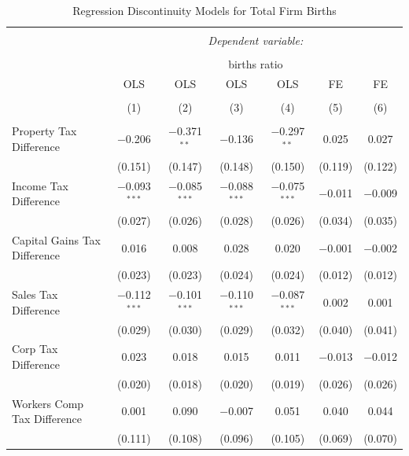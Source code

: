 \documentclass[12pt,a4paper]{article}
\begin{document}
\begin{landscape}

\begin{table}[!htbp] \centering 
  \caption{Regression Discontinuity Models for  Total Firm Births} 
  \label{--rd} 
\begin{tabular}{@{\extracolsep{5pt}}lcccccc} 
\\[-1.8ex]\hline 
\hline \\[-1.8ex] 
 & \multicolumn{6}{c}{\textit{Dependent variable:}} \\ 
\cline{2-7} 
\\[-1.8ex] & \multicolumn{6}{c}{births ratio} \\ 
 & OLS & OLS & OLS & OLS & FE & FE \\ 
\\[-1.8ex] & (1) & (2) & (3) & (4) & (5) & (6)\\ 
\hline \\[-1.8ex] 
 Property Tax Difference & $-$0.206 & $-$0.371$^{**}$ & $-$0.136 & $-$0.297$^{**}$ & 0.025 & 0.027 \\ 
  & (0.151) & (0.147) & (0.148) & (0.150) & (0.119) & (0.122) \\ 
  Income Tax Difference & $-$0.093$^{***}$ & $-$0.085$^{***}$ & $-$0.088$^{***}$ & $-$0.075$^{***}$ & $-$0.011 & $-$0.009 \\ 
  & (0.027) & (0.026) & (0.028) & (0.026) & (0.034) & (0.035) \\ 
  Capital Gains Tax Difference & 0.016 & 0.008 & 0.028 & 0.020 & $-$0.001 & $-$0.002 \\ 
  & (0.023) & (0.023) & (0.024) & (0.024) & (0.012) & (0.012) \\ 
  Sales Tax Difference & $-$0.112$^{***}$ & $-$0.101$^{***}$ & $-$0.110$^{***}$ & $-$0.087$^{***}$ & 0.002 & 0.001 \\ 
  & (0.029) & (0.030) & (0.029) & (0.032) & (0.040) & (0.041) \\ 
  Corp Tax Difference & 0.023 & 0.018 & 0.015 & 0.011 & $-$0.013 & $-$0.012 \\ 
  & (0.020) & (0.018) & (0.020) & (0.019) & (0.026) & (0.026) \\ 
  Workers Comp Tax Difference & 0.001 & 0.090 & $-$0.007 & 0.051 & 0.040 & 0.044 \\ 
  & (0.111) & (0.108) & (0.096) & (0.105) & (0.069) & (0.070) \\ 

\end{tabular}
\end{table}
\end{landscape}
\end{document}
